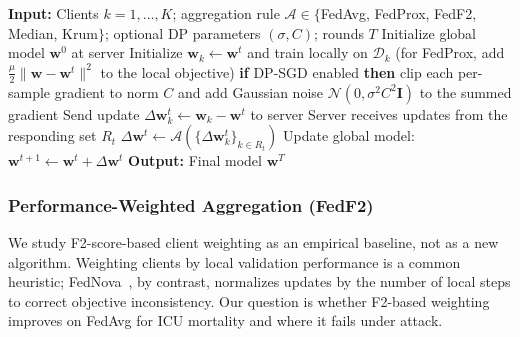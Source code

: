 \documentclass[journal]{IEEEtran}
\begin{document}
\begin{algorithm}[t]
\caption{Federated training with optional DP-SGD and a pluggable aggregation rule. Raw data never leave the clients.}
\label{alg:fl_dp}
\begin{algorithmic}[1]
\State \textbf{Input:} Clients $k = 1, \ldots, K$; aggregation rule $\mathcal{A} \in \{$FedAvg, FedProx, FedF2, Median, Krum$\}$; optional DP parameters $(\sigma, C)$; rounds $T$
\State Initialize global model $\mathbf{w}^0$ at server
    \State Initialize $\mathbf{w}_k \gets \mathbf{w}^t$ and train locally on $\mathcal{D}_k$ (for FedProx, add $\frac{\mu}{2}\|\mathbf{w}-\mathbf{w}^t\|^2$ to the local objective)
    \State \textbf{if} DP-SGD enabled \textbf{then} clip each per-sample gradient to norm $C$ and add Gaussian noise $\mathcal{N}(0,\sigma^2C^2\mathbf{I})$ to the summed gradient
    \State Send update $\Delta\mathbf{w}^t_k \gets \mathbf{w}_k - \mathbf{w}^t$ to server
  \EndFor
  \State Server receives updates from the responding set $R_t$
  \State $\Delta\mathbf{w}^t \gets \mathcal{A}(\{\Delta\mathbf{w}^t_k\}_{k \in R_t})$ 
  \State Update global model: $\mathbf{w}^{t+1} \gets \mathbf{w}^t + \Delta\mathbf{w}^t$
\EndFor
\State \textbf{Output:} Final model $\mathbf{w}^T$
\end{algorithmic}
\end{algorithm}

\subsubsection{Performance-Weighted Aggregation (FedF2)}

We study F2-score-based client weighting as an empirical baseline, not as a new algorithm. Weighting clients by local validation performance is a common heuristic; FedNova~\cite{wang2020fedavg}, by contrast, normalizes updates by the number of local steps to correct objective inconsistency. Our question is whether F2-based weighting improves on FedAvg for ICU mortality and where it fails under attack.
\end{document}
